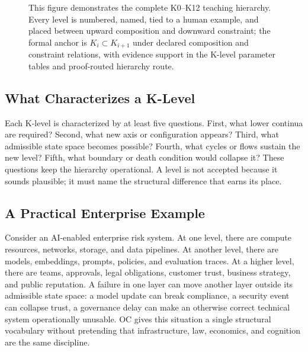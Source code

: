 \begin{figure}[p]
{}
\caption{This figure demonstrates the complete K0--K12 teaching hierarchy. Every level is numbered, named, tied to a human example, and placed between upward composition and downward constraint; the formal anchor is \(K_i \subset K_{i+1}\) under declared composition and constraint relations, with evidence support in the K-level parameter tables and proof-routed hierarchy route.}
\label{fig:r012-k0-k12-hierarchy}
\end{figure}

\subsection{What Characterizes a K-Level}

Each K-level is characterized by at least five questions. First, what lower
continua are required? Second, what new axis or configuration appears? Third,
what admissible state space becomes possible? Fourth, what cycles or flows
sustain the new level? Fifth, what boundary or death condition would collapse
it? These questions keep the hierarchy operational. A level is not accepted
because it sounds plausible; it must name the structural difference that earns
its place.

\subsection{A Practical Enterprise Example}

Consider an AI-enabled enterprise risk system. At one level, there are compute
resources, networks, storage, and data pipelines. At another level, there are
models, embeddings, prompts, policies, and evaluation traces. At a higher
level, there are teams, approvals, legal obligations, customer trust, business
strategy, and public reputation. A failure in one layer can move another layer
outside its admissible state space: a model update can break compliance, a
security event can collapse trust, a governance delay can make an otherwise
correct technical system operationally unusable. OC gives this situation a
single structural vocabulary without pretending that infrastructure, law,
economics, and cognition are the same discipline.

